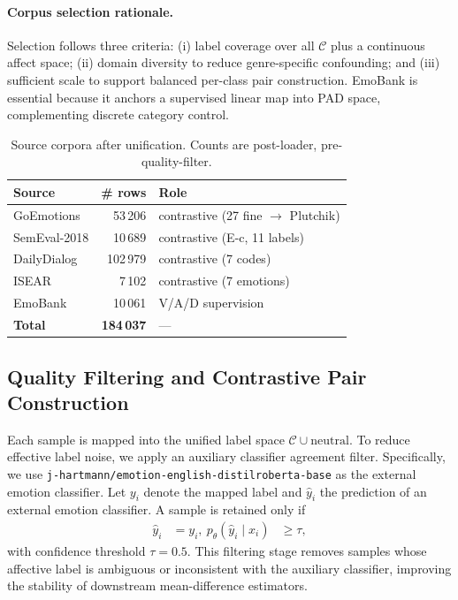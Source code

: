 \paragraph{Corpus selection rationale.}
Selection follows three criteria: (i) label coverage over all
$\mathcal{C}$ plus a continuous affect space; (ii) domain diversity to
reduce genre-specific confounding; and (iii) sufficient scale to support
balanced per-class pair construction. EmoBank is essential because it
anchors a supervised linear map into PAD space, complementing discrete
category control.

\begin{table}[t]
\centering
\small
\begin{tabular}{lrl}
\toprule
Source & \# rows & Role \\
\midrule
GoEmotions     &  53\,206 & contrastive (27 fine $\to$ Plutchik) \\
SemEval-2018   &  10\,689 & contrastive (E-c, 11 labels) \\
DailyDialog    & 102\,979 & contrastive (7 codes) \\
ISEAR          &   7\,102 & contrastive (7 emotions) \\
EmoBank        &  10\,061 & V/A/D supervision \\
\midrule
\textbf{Total} & \textbf{184\,037} & --- \\
\bottomrule
\end{tabular}
\caption{Source corpora after unification. Counts are post-loader,
pre-quality-filter.}
\label{tab:dev:sources}
\end{table}

\subsection{Quality Filtering and Contrastive Pair Construction}

Each sample is mapped into the unified label space
$\mathcal{C}\cup{\mathrm{neutral}}$.
To reduce effective label noise, we apply an auxiliary classifier
agreement filter.
Specifically, we use \texttt{j-hartmann/emotion-english-distilroberta-base}
as the external emotion classifier.
Let $y_i$ denote the mapped label and $\hat y_i$ the prediction of an
external emotion classifier.
A sample is retained only if
\begin{align}
\hat y_i &= y_i, \
p_\theta(\hat y_i \mid x_i) &\ge \tau,
\end{align}
with confidence threshold $\tau = 0.5$.
This filtering stage removes samples whose affective label is ambiguous
or inconsistent with the auxiliary classifier, improving the stability
of downstream mean-difference estimators.

